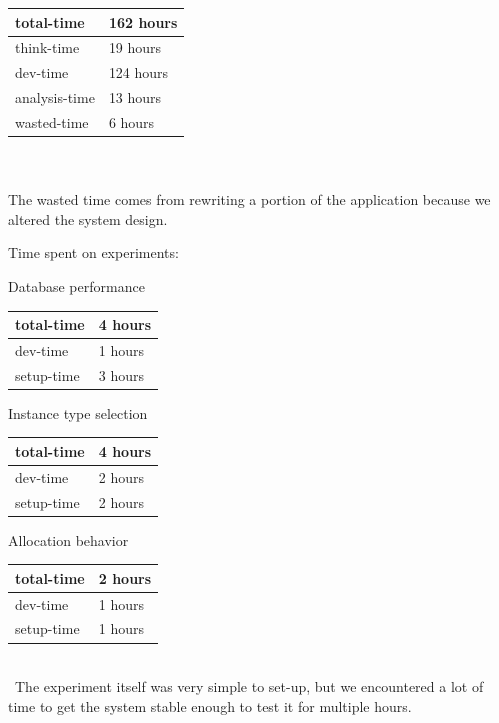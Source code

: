 \documentclass[a4paper]{IEEEtran}
\begin{document}

\begin{tabular}{| l | l |}
\hline
total-time & 162 hours \\ \hline
think-time & 19 hours \\ \hline
dev-time & 124 hours \\ \hline
analysis-time & 13 hours \\ \hline
wasted-time & 6 hours \\ \hline
\end{tabular}
\\\ 
\\
The wasted time comes from rewriting a portion of the application because we altered the system design.

Time spent on experiments:
\begin{LaTeXdescription}
\item[Database performance] \ \\
\begin{tabular}{| l | l |}
\hline
total-time & 4 hours \\ \hline
dev-time & 1 hours \\ \hline
setup-time & 3 hours \\ \hline
\end{tabular}
\item[Instance type selection] \ \\
\begin{tabular}{| l | l |}
\hline
total-time & 4 hours \\ \hline
dev-time & 2 hours \\ \hline
setup-time & 2 hours \\ \hline
\end{tabular}
\item[Allocation behavior] \ \\
\begin{tabular}{| l | l |}
\hline
total-time & 2 hours \\ \hline
dev-time & 1 hours \\ \hline
setup-time & 1 hours \\ \hline
\end{tabular}
\\\ 
The experiment itself was very simple to set-up, but we encountered a lot of time to get the system stable enough to test it for multiple hours.
\end{LaTeXdescription}
\end{document}
